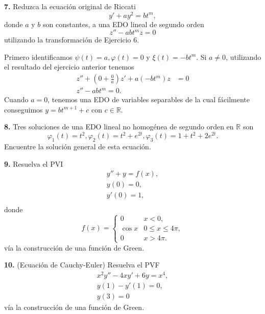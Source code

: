 \documentclass{article}
\newenvironment{statement}[1]{\smallskip\noindent\color[rgb]{1.00,0.00,0.50} {\bf #1.}}{}
\theoremstyle{definition}
\theoremstyle{remark}
\newcommand{\BR}{\mathbb R}
\begin{document}
\begin{statement}{7}
  Reduzca la ecuaci\'on original de Riccati
  \[
    y' + a y^2 = b t^m,  
  \]
  donde $a$ y $b$ son constantes, a una EDO lineal de segundo orden
  \[
    z'' - a b t^m z = 0  
  \]
  utilizando la transformaci\'on de Ejercicio 6.
\end{statement}

\bigskip

Primero identificamos $\psi(t) = a, \varphi(t) = 0$ y $\xi(t) = -b t^m$.
Si $a \neq 0$, utilizando el resultado del ejercicio anterior tenemos
\begin{align*}
  z'' + \left(0 + \frac{0}{a}\right)  z' + a (-b t^m) z &= 0\\
  z'' - a b t^m = 0.
\end{align*}
Cuando $a = 0$, tenemos una EDO de variables separables de la cual f\'acilmente
conseguimos $y = b t^{m + 1} + c$ con $c \in \BR$.

\bigskip

\begin{statement}{8}
  Tres soluciones de una EDO lineal no homog\'enea de segundo orden en $\BR$ son
  \[
    \varphi_1(t) = t^2,
    \varphi_2(t) = t^2 + e^{2t},
    \varphi_3(t) = 1 + t^2 + 2e^{2t}.  
  \]
  Encuentre la soluci\'on general de esta ecuaci\'on.
\end{statement}

\begin{statement}{9}
  Resuelva el PVI
  \begin{gather*}
    y'' + y = f(x),\\
    y(0) = 0,\\
    y'(0) = 1,\\
  \end{gather*}
  donde
  \[
    f(x) =
    \begin{cases}
      0 & x < 0,\\
      \cos x & 0 \leq x \leq 4 \pi,\\
      0 & x > 4 \pi.
    \end{cases}  
  \]
  v\'ia la construcci\'on de una funci\'on de Green.
\end{statement}

\begin{statement}{10}
  (Ecuaci\'on de Cauchy-Euler)
  Resuelva el PVF
  \begin{gather*}
    x^2 y'' - 4xy' + 6y = x^4,\\
    y(1) - y'(1) = 0,\\
    y(3) = 0
  \end{gather*}
  v\'ia la construcci\'on de una funci\'on de Green.
\end{statement}
\end{document}
